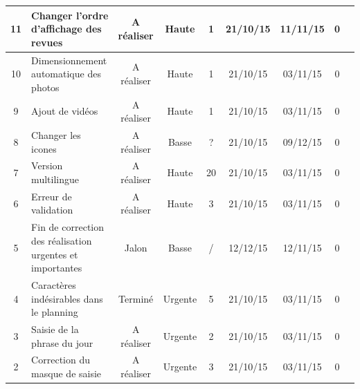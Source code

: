 \documentclass[11pt]{report}
\begin{document}
\begin{tabular}{ | c | p{4cm} | c | c | c | c | c | c | c |  }
11 & Changer l'ordre d'affichage des revues & A réaliser & Haute & 1 & 21/10/15
	& 11/11/15 & 0 & \\ \hline
10 & Dimensionnement automatique des photos & A réaliser & Haute & 1 & 21/10/15
	& 03/11/15 & 0 & \\ \hline
9 & Ajout de vidéos & A réaliser & Haute & 1 & 21/10/15 & 03/11/15 & 0 & \\
\hline
8 & Changer les icones & A réaliser & Basse & ? & 21/10/15 & 09/12/15 & 0 & \\
\hline
7 & Version multilingue & A réaliser & Haute & 20 & 21/10/15 & 03/11/15 & 0 & \\
\hline
6 & Erreur de validation & A réaliser & Haute & 3 & 21/10/15 & 03/11/15 & 0 & \\
\hline
5 & Fin de correction des réalisation urgentes et importantes & Jalon & Basse &
	/ & 12/12/15 & 12/11/15 & 0 & \\ \hline
4 & Caractères indésirables dans le planning & Terminé & Urgente & 5 & 21/10/15
	& 03/11/15 & 0 & \\ \hline
3 & Saisie de la phrase du jour & A réaliser & Urgente & 2 & 21/10/15 & 03/11/15
	& 0 & \\ \hline
2 & Correction du masque de saisie & A réaliser & Urgente & 3 & 21/10/15 &
	03/11/15 & 0 & \\ \hline
 \end{tabular}
 \begin{landscape}
   
\end{landscape}
\clearpage
\end{document}
